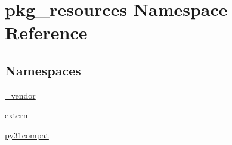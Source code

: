 \hypertarget{namespacepkg__resources}{}\section{pkg\+\_\+resources Namespace Reference}
\label{namespacepkg__resources}
\subsection*{Namespaces}
\begin{DoxyCompactItemize}
\item 
 \hyperlink{namespacepkg__resources_1_1__vendor}{\+\_\+vendor}
\item 
 \hyperlink{namespacepkg__resources_1_1extern}{extern}
\item 
 \hyperlink{namespacepkg__resources_1_1py31compat}{py31compat}
\end{DoxyCompactItemize}
